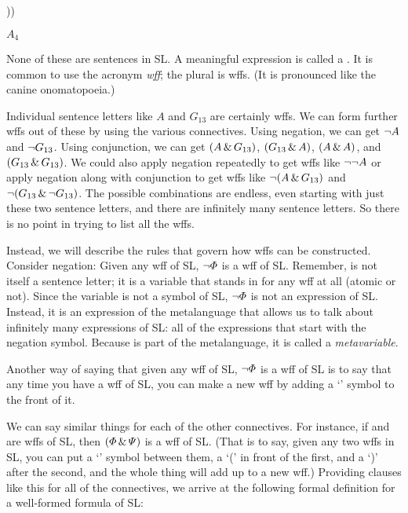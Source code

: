 \begin{earg}
\item[] \enot\enot\enot\enot
\item[] ))\eiff
\item[] $A_4$ \eor
\end{earg}

None of these are sentences in SL. A meaningful expression is called a . It is common to use the acronym \emph{wff}; the plural is wffs. (It is pronounced like the canine onomatopoeia.)

Individual sentence letters like $A$ and $G_{13}$ are certainly wffs. We can form further wffs out of these by using the various connectives. Using negation, we can get $\neg A$ and $\neg G_{13}$. Using conjunction, we can get $(A \,\&\, G_{13})$, $(G_{13} \,\&\, A)$, $(A \,\&\, A)$, and $(G_{13} \,\&\, G_{13})$. We could also apply negation repeatedly to get wffs like $\neg \neg A$ or apply negation along with conjunction to get wffs like $\neg(A \,\&\, G_{13})$ and $\neg(G_{13} \,\&\, \neg G_{13})$. The possible combinations are endless, even starting with just these two sentence letters, and there are infinitely many sentence letters. So there is no point in trying to list all the wffs.

Instead, we will describe the rules that govern how wffs can be constructed. Consider negation: Given any wff \metaA{} of SL, $\neg\varPhi{}$ is a wff of SL. Remember, \metaA{} is not itself a sentence letter; it is a variable that stands in for any wff at all (atomic or not). Since the variable \metaA{} is not a symbol of SL, $\neg\varPhi{}$ is not an expression of SL. Instead, it is an expression of the metalanguage that allows us to talk about infinitely many expressions of SL: all of the expressions that start with the negation symbol. Because \metaA{} is part of the metalanguage, it is called a \emph{metavariable}.

Another way of saying that given any wff \metaA{} of SL, $\neg\varPhi{}$ is a wff of SL is to say that any time you have a wff of SL, you can make a new wff by adding a `\enot' symbol to the front of it.

We can say similar things for each of the other connectives. For instance, if \metaA{} and \metaB{} are wffs of SL, then $(\varPhi{}\,\&\,\varPsi{})$ is a wff of SL. (That is to say, given any two wffs in SL, you can put a `\eand' symbol between them, a `(' in front of the first, and a `)' after the second, and the whole thing will add up to a new wff.)  Providing clauses like this for all of the connectives, we arrive at the following formal definition for a {well-formed formula of SL}:

